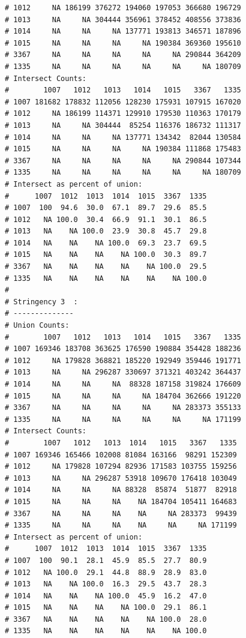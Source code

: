 \documentclass{article}\usepackage[]{graphicx}\usepackage[]{color}
\makeatletter
\newenvironment{kframe}{%
 \def\at@end@of@kframe{}%
 \ifinner\ifhmode%
  \def\at@end@of@kframe{\end{minipage}}%
  \begin{minipage}{\columnwidth}%
 \fi\fi%
 \def\FrameCommand##1{\hskip\@totalleftmargin \hskip-\fboxsep
 \colorbox{shadecolor}{##1}\hskip-\fboxsep
     \hskip-\linewidth \hskip-\@totalleftmargin \hskip\columnwidth}%
 \MakeFramed {\advance\hsize-\width
   \@totalleftmargin\z@ \linewidth\hsize
   \@setminipage}}%
 {\par\unskip\endMakeFramed%
 \at@end@of@kframe}
\newenvironment{knitrout}{}{} %
\makeatother
\begin{document}
\begin{knitrout}
\begin{kframe}
\begin{verbatim}
# 1012     NA 186199 376272 194060 197053 366680 196729
# 1013     NA     NA 304444 356961 378452 408556 373836
# 1014     NA     NA     NA 137771 193813 346571 187896
# 1015     NA     NA     NA     NA 190384 369360 195610
# 3367     NA     NA     NA     NA     NA 290844 364209
# 1335     NA     NA     NA     NA     NA     NA 180709
# Intersect Counts:
#        1007   1012   1013   1014   1015   3367   1335
# 1007 181682 178832 112056 128230 175931 107915 167020
# 1012     NA 186199 114371 129910 179530 110363 170179
# 1013     NA     NA 304444  85254 116376 186732 111317
# 1014     NA     NA     NA 137771 134342  82044 130584
# 1015     NA     NA     NA     NA 190384 111868 175483
# 3367     NA     NA     NA     NA     NA 290844 107344
# 1335     NA     NA     NA     NA     NA     NA 180709
# Intersect as percent of union:
#      1007  1012  1013  1014  1015  3367  1335
# 1007  100  94.6  30.0  67.1  89.7  29.6  85.5
# 1012   NA 100.0  30.4  66.9  91.1  30.1  86.5
# 1013   NA    NA 100.0  23.9  30.8  45.7  29.8
# 1014   NA    NA    NA 100.0  69.3  23.7  69.5
# 1015   NA    NA    NA    NA 100.0  30.3  89.7
# 3367   NA    NA    NA    NA    NA 100.0  29.5
# 1335   NA    NA    NA    NA    NA    NA 100.0
# 
# Stringency 3  :
# --------------
# Union Counts:
#        1007   1012   1013   1014   1015   3367   1335
# 1007 169346 183708 363625 176590 190884 354428 188236
# 1012     NA 179828 368821 185220 192949 359446 191771
# 1013     NA     NA 296287 330697 371321 403242 364437
# 1014     NA     NA     NA  88328 187158 319824 176609
# 1015     NA     NA     NA     NA 184704 362666 191220
# 3367     NA     NA     NA     NA     NA 283373 355133
# 1335     NA     NA     NA     NA     NA     NA 171199
# Intersect Counts:
#        1007   1012   1013  1014   1015   3367   1335
# 1007 169346 165466 102008 81084 163166  98291 152309
# 1012     NA 179828 107294 82936 171583 103755 159256
# 1013     NA     NA 296287 53918 109670 176418 103049
# 1014     NA     NA     NA 88328  85874  51877  82918
# 1015     NA     NA     NA    NA 184704 105411 164683
# 3367     NA     NA     NA    NA     NA 283373  99439
# 1335     NA     NA     NA    NA     NA     NA 171199
# Intersect as percent of union:
#      1007  1012  1013  1014  1015  3367  1335
# 1007  100  90.1  28.1  45.9  85.5  27.7  80.9
# 1012   NA 100.0  29.1  44.8  88.9  28.9  83.0
# 1013   NA    NA 100.0  16.3  29.5  43.7  28.3
# 1014   NA    NA    NA 100.0  45.9  16.2  47.0
# 1015   NA    NA    NA    NA 100.0  29.1  86.1
# 3367   NA    NA    NA    NA    NA 100.0  28.0
# 1335   NA    NA    NA    NA    NA    NA 100.0

\end{verbatim}
\end{kframe}
\end{knitrout}
\end{document}
